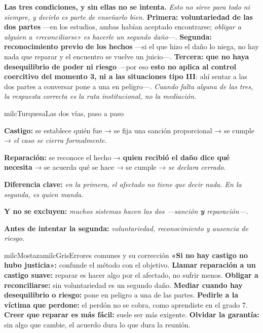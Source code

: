\documentclass[11pt,letterpaper]{article}
\newcommand{\milcpaso}[3]{%
\Needspace{4\baselineskip}%
\begin{tcolorbox}[enhanced,colback=white,colframe=milcLinea,arc=1.5mm,boxrule=.9pt,
  left=14mm,right=4mm,top=3mm,bottom=3mm,before skip=4pt,after skip=4pt,
  fontupper=\RaggedRight,
  overlay={\node[anchor=north west,circle,fill=#2,text=white,inner sep=0pt,
    minimum size=7.4mm,font=\sffamily\bfseries\small]
    at ([xshift=3.6mm,yshift=-3.2mm]frame.north west) {#1};}]
#3
\end{tcolorbox}}
\begin{document}
\milcpaso{4}{milcTurquesa}{\textbf{Las tres condiciones, y sin ellas no se intenta.} \emph{Esto no sirve para todo ni siempre, y decirlo es parte de enseñarlo bien.} \textbf{Primera: voluntariedad de las dos partes} ---en los estudios, ambas habían aceptado encontrarse; \emph{obligar a alguien a «reconciliarse» es hacerle un segundo daño}---. \textbf{Segunda: reconocimiento previo de los hechos} ---si el que hizo el daño lo niega, no hay nada que reparar y el encuentro se vuelve un juicio---. \textbf{Tercera: que no haya desequilibrio de poder ni riesgo} ---por eso \textbf{esto no aplica al control coercitivo del momento 3, ni a las situaciones tipo III}: ahí sentar a las dos partes a conversar pone a una en peligro---. \emph{Cuando falta alguna de las tres, la respuesta correcta es la ruta institucional, no la mediación.}}

\begin{drawbox}{milcTurquesa}{Las dos vías, paso a paso}
\begin{pasoslista}
\item \textbf{Castigo:} se establece quién fue → se fija una sanción proporcional → se cumple → \emph{el caso se cierra formalmente}.
\item \textbf{Reparación:} se reconoce el hecho → \textbf{quien recibió el daño dice qué necesita} → se acuerda qué se hace → se cumple → \emph{se declara cerrado}.
\item \textbf{Diferencia clave:} \emph{en la primera, el afectado no tiene que decir nada. En la segunda, es quien manda.}
\item \textbf{Y no se excluyen:} \emph{muchos sistemas hacen las dos ---sanción \textbf{y} reparación---.}
\item \textbf{Antes de intentar la segunda:} \emph{voluntariedad, reconocimiento y ausencia de riesgo.}
\end{pasoslista}
\end{drawbox}

\begin{softbox}{milcMostaza}{milcGris}{Errores comunes y su corrección}
\textbf{«Si no hay castigo no hubo justicia»:} confunde el método con el objetivo. \textbf{Llamar reparación a un castigo suave:} reparar es hacer algo por el afectado, no sufrir menos. \textbf{Obligar a reconciliarse:} sin voluntariedad es un segundo daño. \textbf{Mediar cuando hay desequilibrio o riesgo:} pone en peligro a una de las partes. \textbf{Pedirle a la víctima que perdone:} el perdón no se cobra, como aprendiste en el grado 7. \textbf{Creer que reparar es más fácil:} suele ser más exigente. \textbf{Olvidar la garantía:} sin algo que cambie, el acuerdo dura lo que dura la reunión.
\end{softbox}
\end{document}

